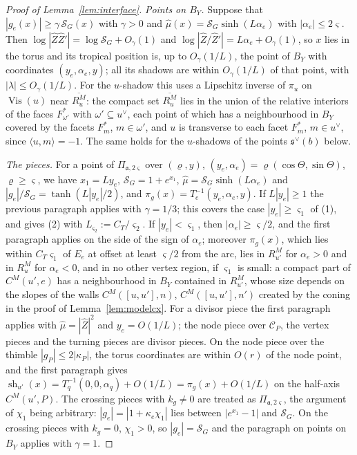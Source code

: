 \begin{proof}[Proof of Lemma~\ref{lem:interface}]
\emph{Points on $B_Y$.} Suppose that $|g_e(x)|\ge\gamma\,\mathcal S_G(x)$ with $\gamma>0$ and $\hat\mu(x)=\mathcal S_G\sinh(L\alpha_e)$
with $|\alpha_e|\le2\varsigma$. Then $\log|\hat Z\hat Z'|=\log\mathcal S_G+O_\gamma(1)$ and $\log|\hat Z/\hat Z'|=L\alpha_e+
O_\gamma(1)$, so $x$ lies in the torus and its tropical position is, up to $O_\gamma(1/L)$, the point of $B_Y$ with
coordinates $(y_e,\alpha_e,y)$; all its shadows are within $O_\gamma(1/L)$ of that point, with $|\lambda|\le O_\gamma(1/L)$.
For the $u$-shadow this uses a Lipschitz inverse of $\pi_u$ on $\operatorname{Vis}(u)$ near $\overline{R^M_u}$: the compact set
$\overline{R^M_u}$ lies in the union of the relative interiors of the faces $F^*_{\omega'}$ with $\omega'\subseteq u^\vee$,
each point of which has a neighbourhood in $B_Y$ covered by the facets $F^*_m$, $m\in\omega'$, and $u$ is transverse to
each facet $F^*_m$, $m\in u^\vee$, since $\langle u,m\rangle=-1$. The same holds for the $u$-shadows of the points
$\mathfrak s^\vee(b)$ below.

\emph{The pieces.} For a point of $\Pi_{\mathfrak a,2\varsigma}$ over $(\varrho,y)$, $(y_e,\alpha_e)=\varrho(\cos\Theta,\sin\Theta)$,
$\varrho\ge\varsigma$, we have $x_1=Ly_e$, $\mathcal S_G=1+e^{x_1}$, $\hat\mu=\mathcal S_G\sinh(L\alpha_e)$ and
$|g_e|/\mathcal S_G=\tanh(L|y_e|/2)$, and $\pi_g(x)=T_e^{-1}(y_e,\alpha_e,y)$. If $L|y_e|\ge1$ the previous paragraph
applies with $\gamma=1/3$; this covers the case $|y_e|\ge\varsigma_1$ of (1), and gives (2) with $L_{\varsigma_2}:=
C_T/\varsigma_2$. If $|y_e|<\varsigma_1$, then $|\alpha_e|\ge\varsigma/2$, and the first paragraph applies on the side of the
sign of $\alpha_e$; moreover $\pi_g(x)$, which lies within $C_T\varsigma_1$ of $E_e$ at offset at least $\varsigma/2$ from the
arc, lies in $R^M_{u'}$ for $\alpha_e>0$ and in $R^M_u$ for $\alpha_e<0$, and in no other vertex region, if $\varsigma_1$ is
small: a compact part of $C^M(u',e)$ has a neighbourhood in $B_Y$ contained in $R^M_{u'}$, whose size depends on the slopes
of the walls $C^M([u,u'],n)$, $C^M([u,u'],n')$ created by the coning in the proof of Lemma~\ref{lem:modelcx}. For a divisor
piece the first paragraph applies with $\hat\mu=|\hat Z|^2$ and $y_e=O(1/L)$; the node piece over $\mathscr C_P$, the vertex
pieces and the turning pieces are divisor pieces. On the node piece over the thimble $|g_P|\le2|\kappa_P|$, the torus
coordinates are within $O(r)$ of the node point, and the first paragraph gives $\operatorname{sh}_{u'}(x)=T_q^{-1}(0,0,
\alpha_q)+O(1/L)=\pi_g(x)+O(1/L)$ on the half-axis $C^M(u',P)$. The crossing pieces with $k_g\ne0$ are treated as
$\Pi_{\mathfrak a,2\varsigma}$, the argument of $\chi_1$ being arbitrary: $|g_e|=|1+\kappa_e\chi_1|$ lies between
$|e^{x_1}-1|$ and $\mathcal S_G$. On the crossing pieces with $k_g=0$, $\chi_1>0$, so $|g_e|=\mathcal S_G$ and the paragraph on
points on $B_Y$ applies with $\gamma=1$.


\end{proof}
